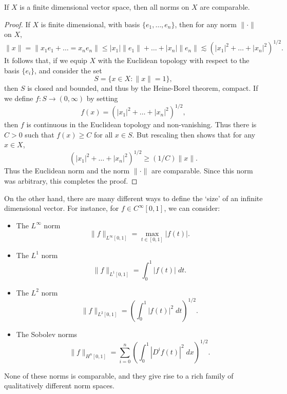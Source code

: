 \begin{theorem}
    If $X$ is a finite dimensional vector space, then all norms on $X$ are comparable.
\end{theorem}
\begin{proof}
    If $X$ is finite dimensional, with basis $\{ e_1,\dots,e_n \}$, then for any norm $\| \cdot \|$ on $X$,
    \[ \| x \| = \| x_1 e_1 + \dots = x_n e_n \| \leq |x_1| \| e_1 \| + \dots + |x_n| \| e_n \| \lesssim \left( |x_1|^2 + \dots + |x_n|^2 \right)^{1/2}. \]
    It follows that, if we equip $X$ with the Euclidean topology with respect to the basis $\{ e_i \}$, and consider the set
    \[ S = \{ x \in X: \| x \| = 1 \}, \]
    then $S$ is closed and bounded, and thus by the Heine-Borel theorem, compact. If we define $f: S \to (0,\infty)$ by setting
    \[ f(x) = \left( |x_1|^2 + \dots + |x_n|^2 \right)^{1/2}, \]
    then $f$ is continuous in the Euclidean topology and non-vanishing. Thus there is $C > 0$ such that $f(x) \geq C$ for all $x \in S$. But rescaling then shows that for any $x \in X$,
    \[ \left( |x_1|^2 + \dots + |x_n|^2 \right)^{1/2} \geq (1/C) \| x \|. \]
    Thus the Euclidean norm and the norm $\| \cdot \|$ are comparable. Since this norm was arbitrary, this completes the proof.
\end{proof}

On the other hand, there are many different ways to define the `size' of an infinite dimensional vector. For instance, for $f \in C^\infty[0,1]$, we can consider:
%
\begin{itemize}
    \item The $L^\infty$ norm
    \[ \| f \|_{L^\infty[0,1]} = \max_{t \in [0,1]} |f(t)|. \]

    \item The $L^1$ norm
    \[ \| f \|_{L^1[0,1]} = \int_0^1 |f(t)|\; dt. \]

    \item The $L^2$ norm
    \[ \| f \|_{L^2[0,1]} = \left( \int_0^1 |f(t)|^2\; dt \right)^{1/2}. \]

    \item The Sobolev norms
    \[ \| f \|_{H^n[0,1]} = \sum_{i = 0}^n \left( \int_0^1 |D^i f(t)|^2\; dx \right)^{1/2}. \]
\end{itemize}
%
None of these norms is comparable, and they give rise to a rich family of qualitatively different norm spaces.

